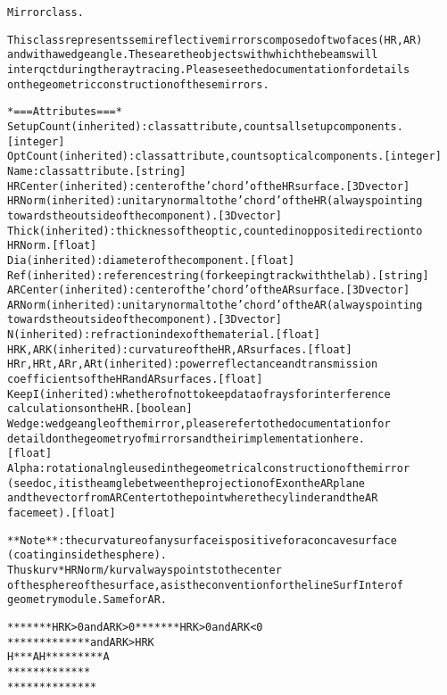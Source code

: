 \begin{alltt}


Mirror class.

This class represents semi reflective mirrors composed of two faces (HR, AR)
and with a wedge angle. These are the objects with which the beams will
interqct during the ray tracing. Please see the documentation for details
on the geometric construction of these mirrors.

*=== Attributes ===*
SetupCount (inherited): class attribute, counts all setup components.
    [integer]
OptCount (inherited): class attribute, counts optical components. [integer]
Name: class attribute. [string]
HRCenter (inherited): center of the 'chord' of the HR surface. [3D vector]
HRNorm (inherited): unitary normal to the 'chord' of the HR (always pointing
 towards the outside of the component). [3D vector]
Thick (inherited): thickness of the optic, counted in opposite direction to
    HRNorm. [float]
Dia (inherited): diameter of the component. [float]
Ref (inherited): reference string (for keeping track with the lab). [string]
ARCenter (inherited): center of the 'chord' of the AR surface. [3D vector]
ARNorm (inherited): unitary normal to the 'chord' of the AR (always pointing
    towards the outside of the component). [3D vector]
N (inherited): refraction index of the material. [float]
HRK, ARK (inherited): curvature of the HR, AR surfaces. [float]
HRr, HRt, ARr, ARt (inherited): power reflectance and transmission
coefficients of the HR and AR surfaces. [float]
KeepI (inherited): whether of not to keep data of rays for interference
calculations on the HR. [boolean]
Wedge: wedge angle of the mirror, please refer to the documentation for
    detaild on the geometry of mirrors and their implementation here.
    [float]
Alpha: rotation alngle used in the geometrical construction of the mirror
    (see doc, it is the amgle between the projection of Ex on the AR plane
    and the vector from ARCenter to the point where the cylinder and the AR
    face meet). [float]

**Note**: the curvature of any surface is positive for a concave surface
(coating inside the sphere).
Thus kurv*HRNorm/{\textbar}kurv{\textbar} always points to the center
of the sphere of the surface, as is the convention for the lineSurfInter of
geometry module. Same for AR.

*******     HRK {\textgreater} 0 and ARK {\textgreater} 0     *******           HRK {\textgreater} 0 and ARK {\textless} 0
 *****                               ********         and {\textbar}ARK{\textbar} {\textgreater} {\textbar}HRK{\textbar}
 H***A                               H*********A
 *****                               ********
*******                             *******
\end{alltt}


